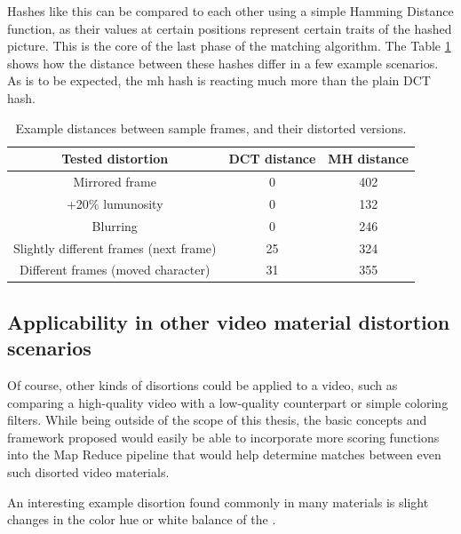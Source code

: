 Hashes like this can be compared to each other using a simple Hamming Distance \cite{hamming-distance} function, as their values at certain positions represent certain traits of the hashed picture. This is the core of the last phase of the matching algorithm. The Table \ref{tab:hash-distances} shows how the distance between these hashes differ in a few example scenarios. As is to be expected, the mh hash is reacting much more than the plain DCT hash. 

\begin{table}[ch!]
  \centering
  \begin{tabular}{|c|c|c|}
    \hline 
    \textbf{Tested distortion}             & \textbf{DCT distance} & \textbf{MH distance} \\ \hline
    Mirrored frame                         & 0                     &  402 \\ \hline
    +20\% lumunosity                       & 0                     &  132 \\ \hline
    Blurring                               & 0                     &  246 \\ \hline
    Slightly different frames (next frame) & 25                    &  324 \\ \hline
    Different frames (moved character)     & 31                    &  355 \\ \hline
    
  \end{tabular}
  \caption{Example distances between sample frames, and their distorted versions.}
  \label{tab:hash-distances}
\end{table}



\subsection{Applicability in other video material distortion scenarios}

Of course, other kinds of disortions could be applied to a video, such as comparing a high-quality video with a low-quality counterpart or simple coloring filters. While being outside of the scope of this thesis, the basic concepts and framework proposed would easily be able to incorporate more scoring functions into the Map Reduce pipeline that would help determine matches between even such disorted video materials. 

An interesting example disortion found commonly in many materials is slight changes in the color hue or white balance of the .


